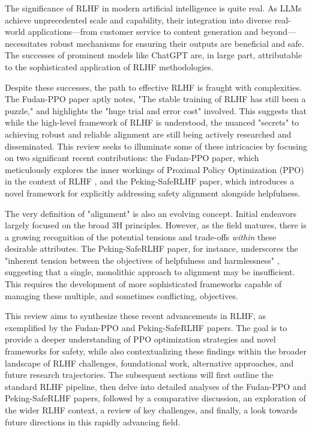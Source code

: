 \documentclass{article}
\begin{document}
The significance of RLHF in modern artificial intelligence is quite real. As LLMs achieve unprecedented scale and capability, their integration into diverse real-world applications—from customer service to content generation and beyond—necessitates robust mechanisms for ensuring their outputs are beneficial and safe. \cite{Zheng2023PPO, Dai2023SafeRLHF} The successes of prominent models like ChatGPT are, in large part, attributable to the sophisticated application of RLHF methodologies. \cite{Ouyang2022InstructGPT}

Despite these successes, the path to effective RLHF is fraught with complexities. The Fudan-PPO paper aptly notes, "The stable training of RLHF has still been a puzzle," and highlights the "huge trial and error cost" involved. \cite{Zheng2023PPO} This suggests that while the high-level framework of RLHF is understood, the nuanced "secrets" to achieving robust and reliable alignment are still being actively researched and disseminated. This review seeks to illuminate some of these intricacies by focusing on two significant recent contributions: the Fudan-PPO paper, which meticulously explores the inner workings of Proximal Policy Optimization (PPO) in the context of RLHF \cite{Zheng2023PPO}, and the Peking-SafeRLHF paper, which introduces a novel framework for explicitly addressing safety alignment alongside helpfulness. \cite{Dai2023SafeRLHF}

The very definition of "alignment" is also an evolving concept. \cite{Lian2024AligningToWhat} Initial endeavors largely focused on the broad 3H principles. \cite{Ouyang2022InstructGPT, Zheng2023PPO} However, as the field matures, there is a growing recognition of the potential tensions and trade-offs \textit{within} these desirable attributes. The Peking-SafeRLHF paper, for instance, underscores the "inherent tension between the objectives of helpfulness and harmlessness" \cite{Dai2023SafeRLHF}, suggesting that a single, monolithic approach to alignment may be insufficient. This requires the development of more sophisticated frameworks capable of managing these multiple, and sometimes conflicting, objectives. \cite{Lian2024AligningToWhat}

This review aims to synthesize these recent advancements in RLHF, as exemplified by the Fudan-PPO and Peking-SafeRLHF papers. The goal is to provide a deeper understanding of PPO optimization strategies and novel frameworks for safety, while also contextualizing these findings within the broader landscape of RLHF challenges, foundational work, alternative approaches, and future research trajectories. The subsequent sections will first outline the standard RLHF pipeline, then delve into detailed analyses of the Fudan-PPO and Peking-SafeRLHF papers, followed by a comparative discussion, an exploration of the wider RLHF context, a review of key challenges, and finally, a look towards future directions in this rapidly advancing field.
\end{document}
